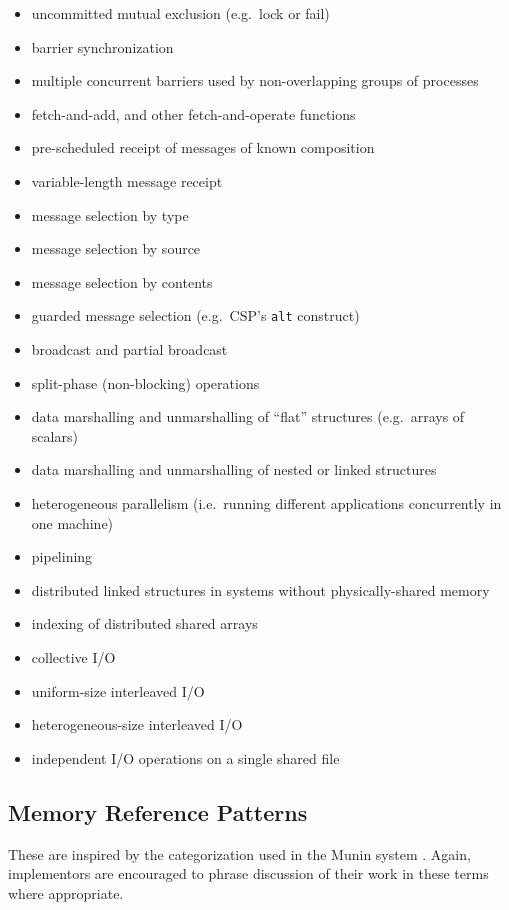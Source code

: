 \begin{itemize}
\item	uncommitted mutual exclusion (e.g.\ lock or fail)
\item	barrier synchronization
\item	multiple concurrent barriers used by non-overlapping groups of processes
\item	fetch-and-add, and other fetch-and-operate functions
\item	pre-scheduled receipt of messages of known composition
\item	variable-length message receipt
\item	message selection by type
\item	message selection by source
\item	message selection by contents
\item	guarded message selection (e.g.\ CSP's {\tt{alt}} construct)
\item	broadcast and partial broadcast
\item	split-phase (non-blocking) operations
\item	data marshalling and unmarshalling of ``flat'' structures (e.g.\ arrays of scalars)
\item	data marshalling and unmarshalling of nested or linked structures
\item	heterogeneous parallelism (i.e.\ running different applications concurrently in one machine)
\item	pipelining
\item	distributed linked structures in systems without physically-shared memory
\item	indexing of distributed shared arrays
\item	collective I/O
\item	uniform-size interleaved I/O
\item	heterogeneous-size interleaved I/O
\item	independent I/O operations on a single shared file
\end{itemize}

\subsection{Memory Reference Patterns\label{s:cliche-memref}}

These are inspired by the categorization used in the Munin system \cite{b:munin-overview}.
Again, implementors are encouraged to phrase discussion of their work in these terms where appropriate.

